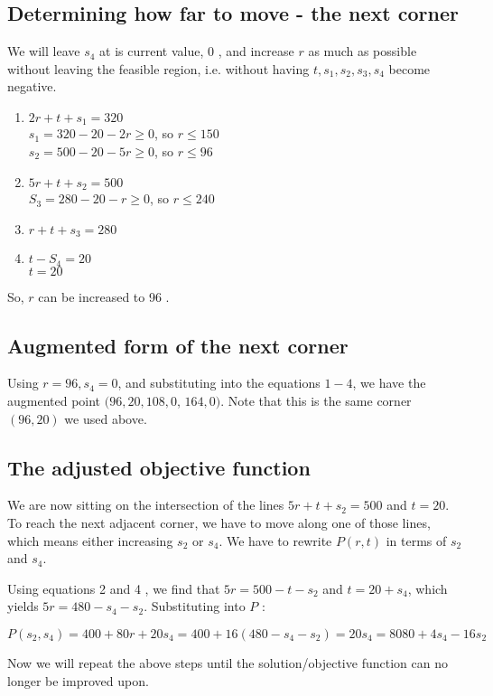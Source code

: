 \subsection{Determining how far to move - the next corner}
We will leave $s_{4}$ at is current value, 0 , and increase $r$ as much as possible without leaving the feasible region, i.e. without having $t, s_{1}, s_{2}, s_{3}, s_{4}$ become negative.

\begin{enumerate}
  \item $2 r+t+s_{1}=320$\\
$s_{1}=320-20-2 r \geq 0$, so $r \leq 150$\\
$s_{2}=500-20-5 r \geq 0$, so $r \leq 96$
  \item $5 r+t+s_{2}=500$\\
$S_{3}=280-20-r \geq 0$, so $r \leq 240$
  \item $r+t+s_{3}=280$
  \item $t-S_{4}=20$\\
$t=20$
\end{enumerate}
So, $r$ can be increased to 96 .

\subsection{Augmented form of the next corner}
Using $r=96, s_{4}=0$, and substituting into the equations $1-4$, we have the augmented point $(96,20,108,0$, $164,0)$. Note that this is the same corner $(96,20)$ we used above.

\subsection{The adjusted objective function}
We are now sitting on the intersection of the lines $5 r+t+s_{2}=500$ and $t=20$. To reach the next adjacent corner, we have to move along one of those lines, which means either increasing $s_{2}$ or $s_{4}$. We have to rewrite $P(r, t)$ in terms of $s_{2}$ and $s_{4}$.

Using equations 2 and 4 , we find that $5 r=500-t-s_{2}$ and $t=20+s_{4}$, which yields $5 r=480-s_{4}-s_{2}$. Substituting into $P$ :

$P\left(s_{2}, s_{4}\right)=400+80 r+20 s_{4}=400+16\left(480-s_{4}-s_{2}\right)=20 s_{4}=8080+4 s_{4}-16 s_{2}$

Now we will repeat the above steps until the solution/objective function can no longer be improved upon.

